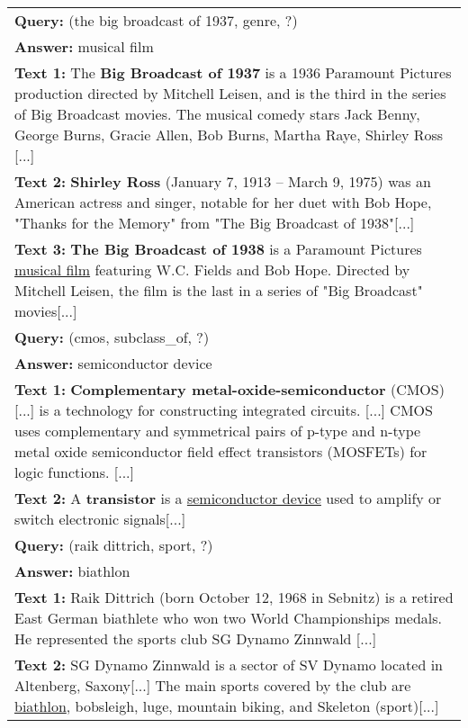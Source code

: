 \documentclass[11pt,letterpaper]{article}
\begin{document}
\begin{table*}
    \centering
    \begin{tabular}{p{\textwidth}}
        \toprule
        \textbf{Query:} (the big broadcast of 1937, genre, ?)\\
        \textbf{Answer:} musical film\\
        \textbf{Text 1:} The \textbf{Big Broadcast of 1937} is a 1936 Paramount Pictures production directed by Mitchell Leisen, and is the third in the series of Big Broadcast movies. 
        The musical comedy stars Jack Benny, George Burns, Gracie Allen, Bob Burns, Martha Raye, Shirley Ross [...]\\
        \textbf{Text 2:} \textbf{Shirley Ross} (January 7, 1913 – March 9, 1975) was an American actress and singer, notable for her duet with Bob Hope, "Thanks for the Memory" from "The Big Broadcast of 1938"[...]\\
        \textbf{Text 3:} \textbf{The Big Broadcast of 1938} is a Paramount Pictures \underline{musical film} featuring W.C. Fields and Bob Hope. 
        Directed by Mitchell Leisen, the film is the last in a series of "Big Broadcast" movies[...]\\
        \midrule
        \textbf{Query:} (cmos, subclass\_of, ?)\\ 
        \textbf{Answer:} semiconductor device \\
        \textbf{Text 1:} \textbf{Complementary metal-oxide-semiconductor} (CMOS) [...] is a technology for constructing integrated circuits. [...] CMOS uses complementary and symmetrical pairs of p-type and n-type metal oxide semiconductor field effect transistors (MOSFETs) for logic functions. [...]\\
        \textbf{Text 2:} A \textbf{transistor} is a \underline{semiconductor device} used to amplify or switch electronic signals[...]\\
        \midrule
        \textbf{Query:} (raik dittrich, sport, ?) \\ 
        \textbf{Answer:} biathlon \\
        \textbf{Text 1:} Raik Dittrich (born October 12, 1968 in Sebnitz) is a retired East German biathlete who won two World Championships medals. He represented the sports club SG Dynamo Zinnwald [...]\\
        \textbf{Text 2:} SG Dynamo Zinnwald is a sector of SV Dynamo located in Altenberg, Saxony[...] The main sports covered by the club are \underline{biathlon}, bobsleigh, luge, mountain biking, and Skeleton (sport)[...] \\

\end{tabular}
\end{table*}
\end{document}
